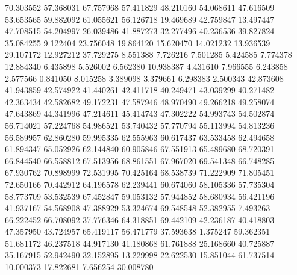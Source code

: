 70.303552
57.368031
67.757968
57.411829
48.210160
54.068611
47.616509
53.653565
59.882092
61.055621
56.126718
19.469689
42.759847
13.497447
47.708515
54.204997
26.039486
41.887273
32.277496
40.236536
39.827824
35.084255
9.122404
23.756048
19.864120
15.620470
14.021232
13.936539
29.107172
12.927212
37.729275
8.551388
7.726216
7.501285
5.424585
7.774378
12.884340
6.435898
5.526002
6.562380
10.938387
4.431610
7.966555
6.243858
2.577566
0.841050
8.015258
3.389098
3.379661
6.298383
2.500343
42.873608
41.943859
42.574922
41.440261
42.411718
40.249471
43.039299
40.271482
42.363434
42.582682
49.172231
47.587946
48.970490
49.266218
49.258074
47.643869
44.341996
47.214611
45.414743
47.302222
54.993743
54.502874
56.714021
57.224768
54.986521
53.740432
57.770794
55.113994
54.813236
56.589957
62.860280
59.995335
62.555963
60.617437
63.533458
62.494658
61.894347
65.052926
62.144840
60.905846
67.551913
65.489680
68.720391
66.844540
66.558812
67.513956
68.861551
67.967020
69.541348
66.748285
67.930762
70.898999
72.531995
70.425164
68.538739
71.222909
71.805451
72.650166
70.442912
64.196578
62.239441
60.674060
58.105336
57.735304
58.773709
53.532539
67.452847
59.053132
57.944852
58.680934
56.421196
41.937167
54.568908
47.388929
53.324674
69.548548
52.382955
7.493263
66.222452
66.708092
37.776346
64.318851
69.442109
42.236187
40.418803
47.357950
43.724957
65.419117
56.471779
37.593638
1.375247
59.362351
51.681172
46.237518
44.917130
41.180868
61.761888
25.168660
40.725887
35.167915
52.942490
32.152895
13.229998
22.622530
15.851044
61.737514
10.000373
17.822681
7.656254
30.008780
